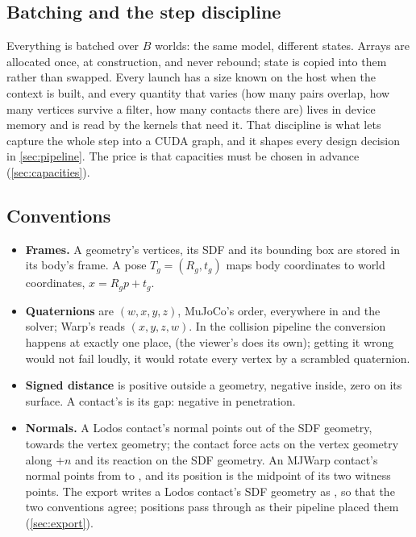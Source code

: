 \subsection{Batching and the step discipline}\label{sec:discipline}

Everything is batched over $B$ worlds: the same model, different states. Arrays are allocated once, at construction, and never rebound; state is copied into them rather than swapped. Every launch has a size known on the host when the context is built, and every quantity that varies (how many pairs overlap, how many vertices survive a filter, how many contacts there are) lives in device memory and is read by the kernels that need it. That discipline is what lets  capture the whole step into a CUDA graph, and it shapes every design decision in \cref{sec:pipeline}. The price is that capacities must be chosen in advance (\cref{sec:capacities}).

\subsection{Conventions}\label{sec:conventions}

\begin{itemize}
\item \textbf{Frames.} A geometry's vertices, its SDF and its bounding box are stored in its body's frame. A pose $T_g = (R_g, t_g)$ maps body coordinates to world coordinates, $x = R_g p + t_g$.
\item \textbf{Quaternions} are $(w, x, y, z)$, MuJoCo's order, everywhere in  and the solver; Warp's  reads $(x, y, z, w)$. In the collision pipeline the conversion happens at exactly one place,  (the viewer's  does its own); getting it wrong would not fail loudly, it would rotate every vertex by a scrambled quaternion.
\item \textbf{Signed distance} is positive outside a geometry, negative inside, zero on its surface. A contact's  is its gap: negative in penetration.
\item \textbf{Normals.} A Lodos contact's normal points out of the SDF geometry, towards the vertex geometry; the contact force acts on the vertex geometry along $+n$ and its reaction on the SDF geometry. An MJWarp contact's normal points from  to , and its position is the midpoint of its two witness points. The export writes a Lodos contact's SDF geometry as , so that the two conventions agree; positions pass through as their pipeline placed them (\cref{sec:export}).
\end{itemize}

